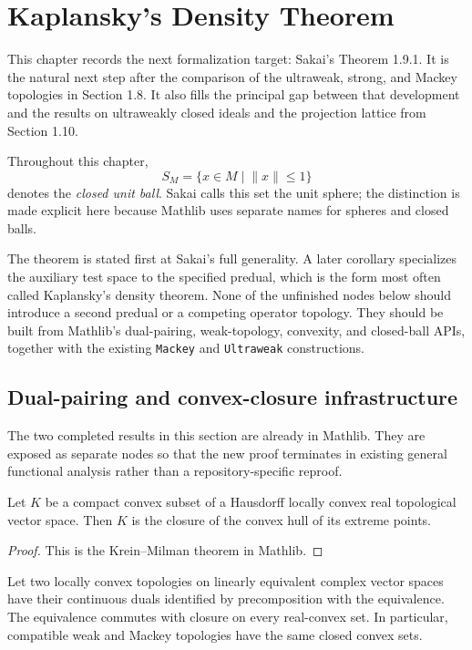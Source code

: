 \chapter{Kaplansky's Density Theorem}

This chapter records the next formalization target: Sakai's Theorem 1.9.1.  It is the natural
next step after the comparison of the ultraweak, strong, and Mackey topologies in Section 1.8.
It also fills the principal gap between that development and the results on ultraweakly closed
ideals and the projection lattice from Section 1.10.

Throughout this chapter,
\[
  S_M=\{x\in M\mid \lVert x\rVert\leq 1\}
\]
denotes the \emph{closed unit ball}.  Sakai calls this set the unit sphere; the distinction is made
explicit here because Mathlib uses separate names for spheres and closed balls.

The theorem is stated first at Sakai's full generality.  A later corollary specializes the auxiliary
test space to the specified predual, which is the form most often called Kaplansky's density
theorem.  None of the unfinished nodes below should introduce a second predual or a competing
operator topology.  They should be built from Mathlib's dual-pairing, weak-topology, convexity, and
closed-ball APIs, together with the existing \texttt{Mackey} and \texttt{Ultraweak} constructions.

\section{Dual-pairing and convex-closure infrastructure}

The two completed results in this section are already in Mathlib.  They are exposed as separate
nodes so that the new proof terminates in existing general functional analysis rather than a
repository-specific reproof.

\begin{theorem}
  \label{thm:krein_milman}
  \mathlibok
  Let $K$ be a compact convex subset of a Hausdorff locally convex real topological vector space.
  Then $K$ is the closure of the convex hull of its extreme points.
\end{theorem}

\begin{proof}
  \leanok
  This is the Krein--Milman theorem in Mathlib.
\end{proof}

\begin{theorem}
  \label{thm:convex_closure_same_dual}
  \mathlibok
  Let two locally convex topologies on linearly equivalent complex vector spaces have their
  continuous duals identified by precomposition with the equivalence.  The equivalence commutes
  with closure on every real-convex set.  In particular, compatible weak and Mackey topologies have
  the same closed convex sets.
\end{theorem}

